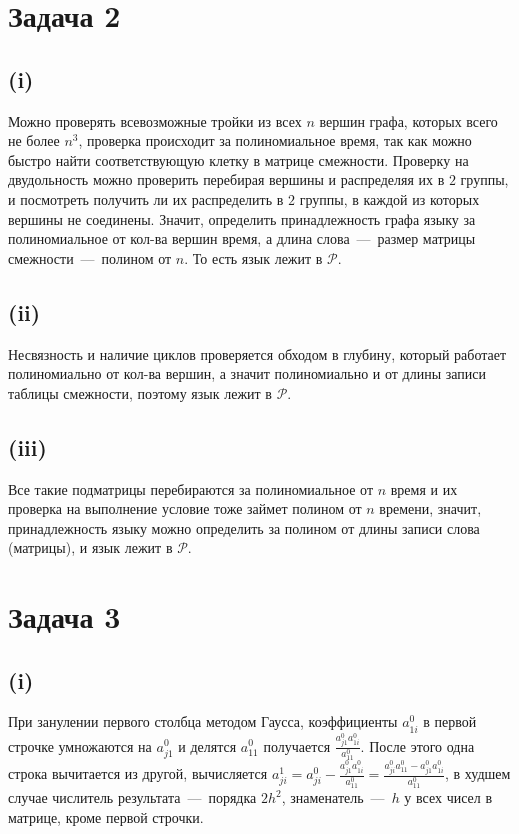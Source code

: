 \documentclass[a4paper,12pt]{article} %
\begin{document}
\section{Задача 2}
\subsection{(i)}
\hspace{5mm}
Можно проверять всевозможные тройки из всех $n$ вершин графа, которых всего не более $n^3$, проверка происходит за полиномиальное время, так как можно быстро найти соответствующую клетку в матрице смежности. Проверку на двудольность можно проверить перебирая вершины и распределяя их в $2$ группы, и посмотреть получить ли их распределить в $2$ группы, в каждой из которых вершины не соединены. Значит, определить принадлежность графа языку за полиномиальное от кол-ва вершин время, а длина слова~---~размер матрицы смежности~---~полином от $n$. То есть язык лежит в $\mathcal{P}$.

\subsection{(ii)}
\hspace{5mm}
Несвязность и наличие циклов проверяется обходом в глубину, который работает полиномиально от кол-ва вершин, а значит полиномиально и от длины записи таблицы смежности, поэтому язык лежит в $\mathcal{P}$.

\subsection{(iii)}
\hspace{5mm}
Все такие подматрицы перебираются за полиномиальное от $n$ время и их проверка на выполнение условие тоже займет полином от $n$ времени, значит, принадлежность языку можно определить за полином от длины записи слова (матрицы), и язык лежит в $\mathcal{P}$.

\section{Задача 3}
\subsection{(i)}
\hspace{5mm}
При занулении первого столбца методом Гаусса, коэффициенты $a_{1i}^0$ в первой строчке умножаются на $a_{j1}^0$ и делятся $a_{11}^0$ получается $\frac{a_{j1}^0 a_{1i}^0}{a_{11}^0}$. После этого одна строка вычитается из другой, вычисляется $a_{ji}^1=a_{ji}^0-\frac{a_{j1}^0a_{1i}^0}{a_{11}^0}=\frac{a_{ji}^0a_{11}^0-a_{j1}^0a_{1i}^0}{a_{11}^0}$, в худшем случае числитель результата~---~порядка $2h^2$, знаменатель~---~$h$ у всех чисел в матрице, кроме первой строчки. 
\end{document}
